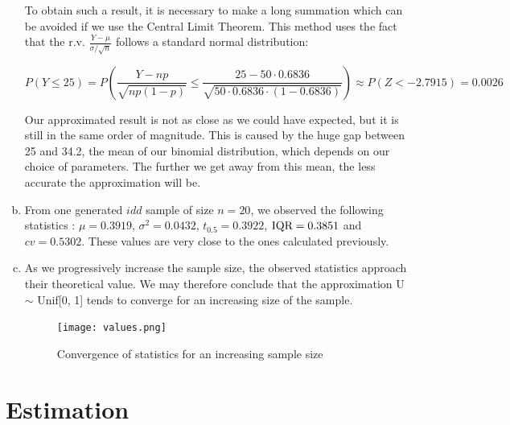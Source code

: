 \documentclass[a4paper]{article}
\begin{document}
\begin{enumerate}[(a)]
To obtain such a result, it is necessary to make a long summation which can be avoided if we use the Central Limit Theorem. This method uses the fact that the r.v. $\frac{Y-\mu}{\sigma / \sqrt{n}}$ follows a standard normal distribution:

$$P(Y \leq 25) = P\left ( \frac{Y-np}{\sqrt{np(1-p)}} \leq \frac{25-50\cdot0.6836}{\sqrt{50\cdot0.6836\cdot(1-0.6836)}} \right ) \approx P(Z < -2.7915) = 0.0026$$

Our approximated result is not as close as we could have expected, but it is still in the same order of magnitude. This is caused by the huge gap between 25 and 34.2, the mean of our binomial distribution, which depends on our choice of parameters. The further we get away from this mean, the less accurate the approximation will be.

\item From one generated $idd$ sample of size $n = 20$, we observed the following statistics : $\mu = 0.3919$, $\sigma^2 = 0.0432$, $t_0.5 = 0.3922$, $\textup{IQR} = 0.3851$ and $cv = 0.5302$.
These values are very close to the ones calculated previously.

\item As we progressively increase the sample size, the observed statistics approach their theoretical value. We may therefore conclude that the approximation U $\sim$ Unif[0, 1] tends to converge for an increasing size of the sample.

\begin{figure}
    \centering
  \texttt{[image: values.png]}
  \caption{Convergence of statistics for an increasing sample size}
\end{figure}

\end{enumerate}


\newpage

\section{Estimation}
\end{document}
